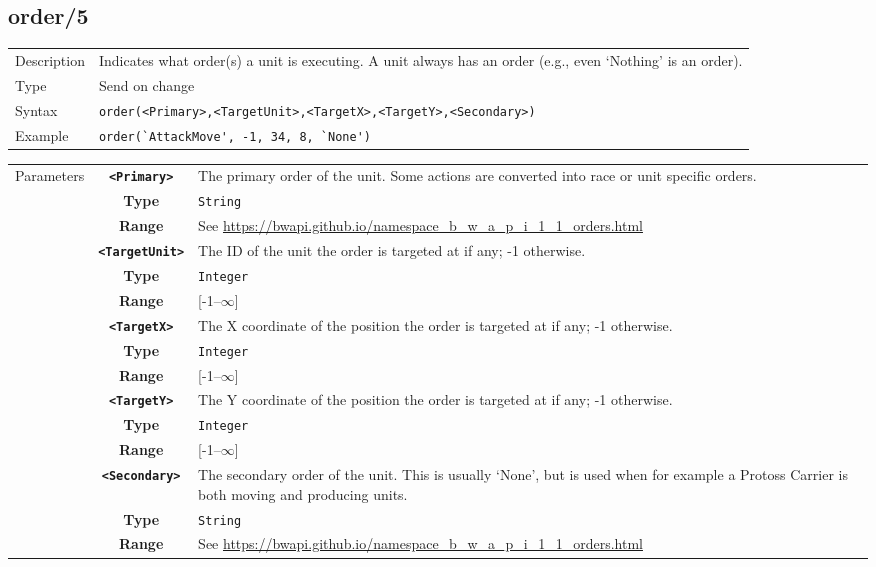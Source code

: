 \subsection{order/5}
\begin{tabularx}{\textwidth}{lX}
 Description & Indicates what order(s) a unit is executing. A unit always has an order (e.g., even `Nothing' is an order). \\
 Type & Send on change \\
 Syntax & \verb|order(<Primary>,<TargetUnit>,<TargetX>,<TargetY>,<Secondary>)| \\
 Example & \verb|order(`AttackMove', -1, 34, 8, `None')|   \\
 \end{tabularx}
 \begin{tabularx}{\textwidth}{l | c | p{8cm}|}
 \cline{2-3}
 Parameters & \textbf{\verb|<Primary>|} & The primary order of the unit. Some actions are converted into race or unit specific orders. \\
            & \textbf{Type} & \verb|String| \\
            &\textbf{Range} &  See \url{https://bwapi.github.io/namespace_b_w_a_p_i_1_1_orders.html} \\
            \cline{2-3}
            & \textbf{\verb|<TargetUnit>|} & The ID of the unit the order is targeted at if any; -1 otherwise. \\
            & \textbf{Type} & \verb|Integer| \\
            &\textbf{Range} &  [-1--$\infty$] \\
            \cline{2-3}
            & \textbf{\verb|<TargetX>|} & The X coordinate of the position the order is targeted at if any; -1 otherwise. \\
            & \textbf{Type} & \verb|Integer| \\
            &\textbf{Range} &  [-1--$\infty$] \\
            \cline{2-3}
            & \textbf{\verb|<TargetY>|} & The Y coordinate of the position the order is targeted at if any; -1 otherwise. \\
            & \textbf{Type} & \verb|Integer| \\
            &\textbf{Range} &  [-1--$\infty$] \\
            \cline{2-3}
            & \textbf{\verb|<Secondary>|} & The secondary order of the unit. This is usually `None', but is used when for example a Protoss Carrier is both moving and producing units.\\
            & \textbf{Type} & \verb|String| \\
            &\textbf{Range} &  See \url{https://bwapi.github.io/namespace_b_w_a_p_i_1_1_orders.html} \\
            \cline{2-3}
\end{tabularx}

